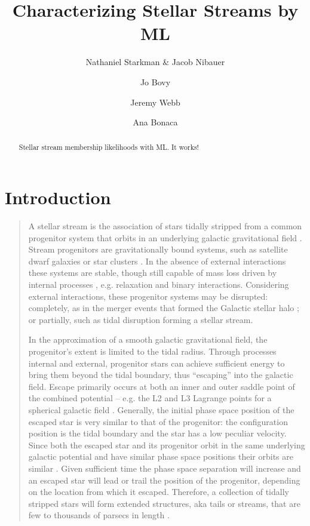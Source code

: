 \documentclass[twocolumn]{aastex631}
\begin{document}
\title{Characterizing Stellar Streams by ML}

\author{Nathaniel Starkman \& Jacob Nibauer}
\author{Jo Bovy}
\author{Jeremy Webb}
\author{Ana Bonaca}

\begin{abstract}
    Stellar stream membership likelihoods with ML. It works!
\end{abstract}

\section{Introduction} \label{sec:intro}


    \begin{quotation}

        A stellar stream is the association of stars tidally stripped from a common
        progenitor system that orbits in an underlying galactic gravitational field
        \citep{Johnston1998, HelmiWhite1999}. Stream progenitors are gravitationally
        bound systems, such as satellite dwarf galaxies or star clusters
        \citep{Odenkirchen2001, Majewski2003}. In the absence of external interactions
        these systems are stable, though still capable of mass loss driven by internal
        processes \citep{Hills1975, HeggieHut2003}, e.g. relaxation and binary
        interactions. Considering external interactions, these progenitor systems may
        be disrupted: completely, as in the merger events that formed the Galactic
        stellar halo \citep{Lynden-Bell1967, Searle1978}; or partially, such as tidal
        disruption forming a stellar stream.

        In the approximation of a smooth galactic gravitational field, the
        progenitor's extent is limited to the tidal radius. Through processes internal
        and external, progenitor stars can achieve sufficient energy to bring them
        beyond the tidal boundary, thus ``escaping'' into the galactic field. Escape
        primarily occurs at both an inner and outer saddle point of the combined
        potential -- e.g. the L2 and L3 Lagrange points for a spherical galactic field
        \citep{Ross1997, Fukushige2000, BinneyTremaine2008}. Generally, the initial
        phase space position of the escaped star is very similar to that of the
        progenitor: the configuration position is the tidal boundary and the star has
        a low peculiar velocity. Since both the escaped star and its progenitor orbit
        in the same underlying galactic potential and have similar phase space
        positions their orbits are similar \citep{BinneyTremaine2008}. Given
        sufficient time the phase space separation will increase and an escaped star
        will lead or trail the position of the progenitor, depending on the location
        from which it escaped. Therefore, a collection of tidally stripped stars will
        form extended structures, aka tails or streams, that are few to thousands of
        parsecs in length \citep{Johnston1998, HelmiWhite1999, Bovy2014}.


\end{quotation}
\end{document}
